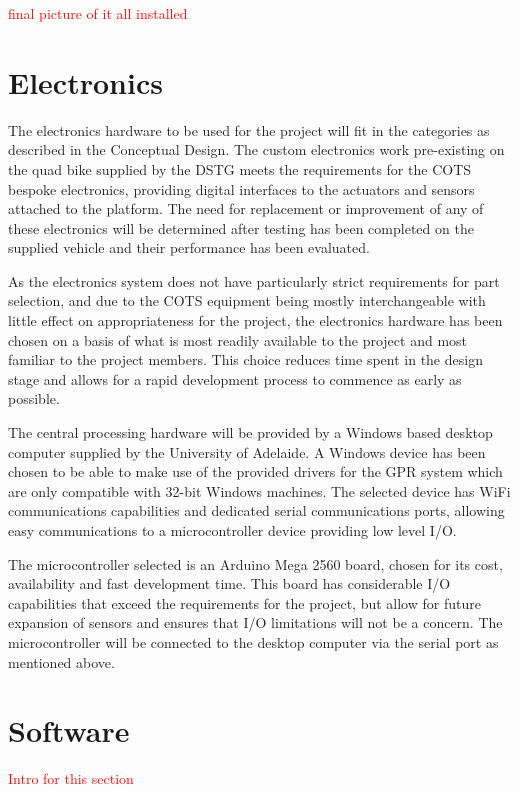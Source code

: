 \documentclass[main.tex]{subfiles}
\begin{document}
\textcolor{red}{final picture of it all installed }  

\section{Electronics}
The electronics hardware to be used for the project will fit in the categories as described in the Conceptual Design. The custom electronics work pre-existing on the quad bike supplied by the DSTG meets the requirements for the COTS bespoke electronics, providing digital interfaces to the actuators and sensors attached to the platform. The need for replacement or improvement of any of these electronics will be determined after testing has been completed on the supplied vehicle and their performance has been evaluated.

As the electronics system does not have particularly strict requirements for part selection, and due to the COTS equipment being mostly interchangeable with little effect on appropriateness for the project, the electronics hardware has been chosen on a basis of what is most readily available to the project and most familiar to the project members. This choice reduces time spent in the design stage and allows for a rapid development process to commence as early as possible.

The central processing hardware will be provided by a Windows based desktop computer supplied by the University of Adelaide. A Windows device has been chosen to be able to make use of the provided drivers for the GPR system which are only compatible with 32-bit Windows machines. The selected device has WiFi communications capabilities and dedicated serial communications ports, allowing easy communications to a microcontroller device providing low level I/O.

The microcontroller selected is an Arduino Mega 2560 board, chosen for its cost, availability and fast development time. This board has considerable I/O capabilities that exceed the requirements for the project, but allow for future expansion of sensors and ensures that I/O limitations will not be a concern. The microcontroller will be connected to the desktop computer via the serial port as mentioned above.

\section{Software}
\textcolor{red}{Intro for this section}
\end{document}
